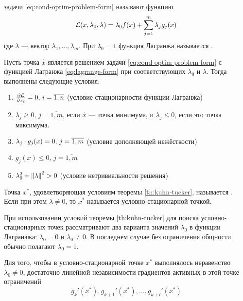 \begin{dfn}  задачи
  \eqref{eq:cond-optim-problem-form} называют функцию
  \begin{equation}
    \label{eq:lagrange-form}
    \mathcal{L}(x, \lambda_0, \lambda) = \lambda_0 f(x) + \sum_{j=1}^m {\lambda_j g_j(x)}
  \end{equation}
  где $\lambda$ — вектор $\lambda_1, \dotsc, \lambda_m$. При
  $\lambda_0=1$ функция Лагранжа называется .
\end{dfn}

\begin{thm}
  \label{th:kuhn-tucker}
  Пусть точка $\hat{x}$ является решением задачи
  \eqref{eq:cond-optim-problem-form} с функцией Лагранжа
  \eqref{eq:lagrange-form} при соответствующих $\lambda_0$ и
  $\lambda$. Тогда выполнены следующие условия:
  \begin{enumerate}
    \renewcommand{\labelenumi}{\emph{\asbuk{enumi})}}
  \item $\frac{\partial{\mathcal{L}}}{\partial{x_i}}=0,\, i=\overline{1,n}$ (условие
    стационарности функции Лагранжа)
  \item $\lambda_j \geq 0,\, j=\overline{1,m}$, если $\hat{x}$ — точка
    минимума, и $\lambda_j \leq 0$, если это точка максимума.
  \item $\lambda_j \cdot g_j(x) = 0,\, j=\overline{1,m}$ (условие
    дополняющей нежёсткости)
  \item $g_j(x) \leq 0,\, j=\overline{1,m}$
  \item $\lambda_0^2 + \left \lVert{\lambda}\right \rVert^2 > 0$ (условие нетривиальности решения)
  \end{enumerate}
\end{thm}

\begin{dfn}
  Точка $x^*$, удовлетворяющая условиям теоремы \ref{th:kuhn-tucker},
  называется . Если при этом $\lambda ≠
  0$, то $x^*$ называется  условно-стационарной
  точкой.
\end{dfn}

При использовании условий теоремы \ref{th:kuhn-tucker} для поиска
условно-стационарных точек рассматривают два варианта значений
$\lambda_0$ в функции Лагранажа: $\lambda_0=0$ и $\lambda_0 \neq 0$. В
последнем случае без ограничения общности обычно полагают $\lambda_0 =
1$.

\begin{thm}
  \label{th:regular}
  Для того, чтобы в условно-стационарной точке $x^*$ выполнялось
  неравенство $\lambda_0 \neq 0$, достаточно линейной независимости
  градиентов активных в этой точке ограничений
  \begin{equation*}
    g_k'(x^*), g_{k+1}'(x^*), \dotsc, g_{k+l}'(x^*)
  \end{equation*}
\end{thm}

